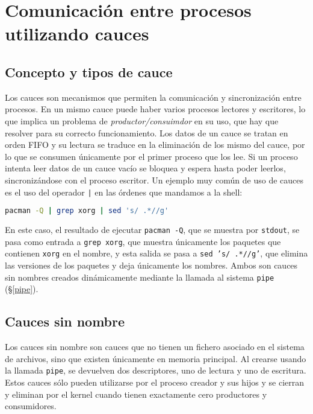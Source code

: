 \section{Comunicación entre procesos utilizando cauces}

\subsection{Concepto y tipos de cauce}

Los cauces son mecanismos que permiten la comunicación y sincronización entre procesos.
En un mismo cauce puede haber varios procesos lectores y escritores, lo que implica un problema de \emph{productor/consuimdor} en su uso, que hay que resolver para su correcto funcionamiento.
Los datos de un cauce se tratan en orden FIFO y su lectura se traduce en la eliminación de los mismo del cauce, por lo que se consumen únicamente por el primer proceso que los lee.
Si un proceso intenta leer datos de un cauce vacío se bloquea y espera hasta poder leerlos, sincronizándose con el proceso escritor.
Un ejemplo muy común de uso de cauces es el uso del operador \texttt{|} en las órdenes que mandamos a la shell:

\begin{lstlisting}[language=Bash]
pacman -Q | grep xorg | sed 's/ .*//g'
\end{lstlisting}

En este caso, el resultado de ejecutar \texttt{pacman -Q}, que se muestra por \texttt{stdout}, se pasa como entrada a \texttt{grep xorg}, que muestra únicamente los paquetes que contienen \texttt{xorg} en el nombre, y esta salida se pasa a \texttt{sed 's/ .*//g'}, que elimina las versiones de los paquetes y deja únicamente los nombres.
Ambos son cauces sin nombres creados dinámicamente mediante la llamada al sistema \texttt{pipe} (\S\ref{pipe}).

\subsection{Cauces sin nombre}

Los cauces sin nombre son cauces que no tienen un fichero asociado en el sistema de archivos, sino que existen únicamente en memoria principal.
Al crearse usando la llamada \texttt{pipe}, se devuelven dos descriptores, uno de lectura y uno de escritura.
Estos cauces sólo pueden utilizarse por el proceso creador y sus hijos y se cierran y eliminan por el kernel cuando tienen exactamente cero productores y consumidores.

